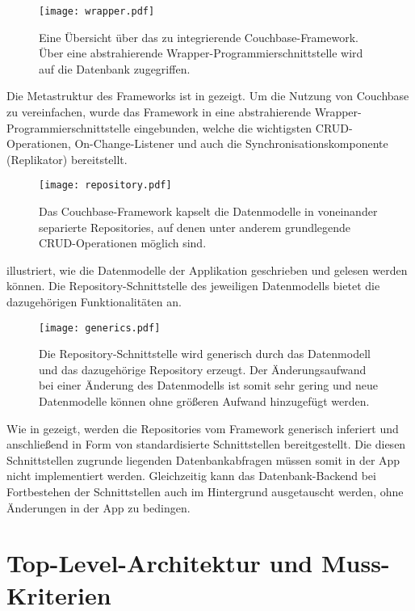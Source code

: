 \begin{figure}[H]
\texttt{[image: wrapper.pdf]}
\caption{Eine Übersicht über das zu integrierende Couchbase-Framework. Über eine abstrahierende Wrapper-Programmierschnittstelle wird auf die Datenbank zugegriffen.}\label{fig:wrapper}
\end{figure}

Die Metastruktur des Frameworks ist in  gezeigt. Um die Nutzung von Couchbase zu vereinfachen, wurde das Framework in eine abstrahierende Wrapper-Programmierschnittstelle eingebunden, welche die wichtigsten CRUD-Operationen, On-Change-Listener und auch die Synchronisationskomponente (Replikator) bereitstellt.

\begin{figure}[H]
\texttt{[image: repository.pdf]}
\caption{Das Couchbase-Framework kapselt die Datenmodelle in voneinander separierte Repositories, auf denen unter anderem grundlegende CRUD-Operationen möglich sind.}\label{fig:repository}
\end{figure}

 illustriert, wie die Datenmodelle der Applikation geschrieben und gelesen werden können. Die Repository-Schnittstelle des jeweiligen Datenmodells bietet die dazugehörigen Funktionalitäten an.

\begin{figure}[H]
\texttt{[image: generics.pdf]}
\caption{Die Repository-Schnittstelle wird generisch durch das Datenmodell und das dazugehörige Repository erzeugt. Der Änderungsaufwand bei einer Änderung des Datenmodells ist somit sehr gering und neue Datenmodelle können ohne größeren Aufwand hinzugefügt werden.}\label{fig:generics}
\end{figure}

Wie in  gezeigt, werden die Repositories vom Framework generisch inferiert und anschließend in Form von standardisierte Schnittstellen bereitgestellt. Die diesen Schnittstellen zugrunde liegenden Datenbankabfragen müssen somit in der App nicht implementiert werden. Gleichzeitig kann das Datenbank-Backend bei Fortbestehen der Schnittstellen auch im Hintergrund ausgetauscht werden, ohne Änderungen in der App zu bedingen.

\section{Top-Level-Architektur und Muss-Kriterien}


